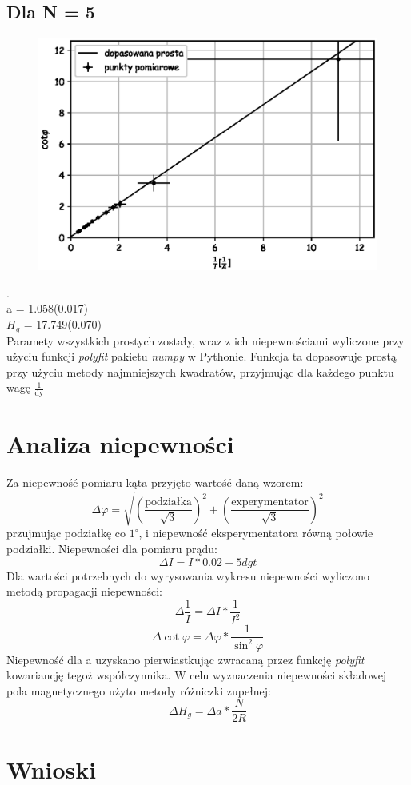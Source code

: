 \documentclass[a4paper,10pt]{article}
\begin{document}
\subsection{Dla N = 5}

\begin{figure}[H]
  \includegraphics{./wykres_5.eps}
  \caption{}
  \label{}
\end{figure}.
\\a = 1.058(0.017)\\
$H_g$ = 17.749(0.070)\\
Paramety wszystkich prostych zostały, wraz z ich niepewnościami wyliczone przy użyciu funkcji \emph{polyfit} pakietu \emph{numpy} w Pythonie. Funkcja ta
dopasowuje prostą przy użyciu metody najmniejszych kwadratów, przyjmując dla każdego punktu wagę $\frac{1}{\text{dy}}$

\section{Analiza niepewności}
Za niepewność pomiaru kąta przyjęto wartość daną wzorem:
\begin{equation}
  \Delta \varphi = \sqrt{(\frac{\text{podziałka}}{\sqrt{3}})^2+(\frac{\text{experymentator}}{\sqrt{3}})^2}
\end{equation}
przujmując podziałkę co $1^\circ$, i niepewność eksperymentatora równą połowie podziałki.
Niepewności dla pomiaru prądu:
\begin{equation}
  \Delta I = I*0.02+5dgt
\end{equation}
Dla wartości potrzebnych do wyrysowania wykresu niepewności wyliczono metodą propagacji niepewności:\\
\begin{equation}
  \Delta \frac{1}{I} = \Delta I * \frac{1}{I^2}
\end{equation}
\begin{equation}
  \Delta \cot{\varphi} = \Delta \varphi * \frac{1}{\sin^2{\varphi}}
\end{equation}
Niepewność dla a uzyskano pierwiastkując zwracaną przez funkcję \emph{polyfit} kowariancję tegoż współczynnika. W celu wyznaczenia niepewności składowej pola
magnetycznego użyto %
metody różniczki zupełnej:
\begin{equation}
  \Delta H_g = \Delta a * \frac{N}{2R}%
\end{equation}
\section{Wnioski}
\end{document}
